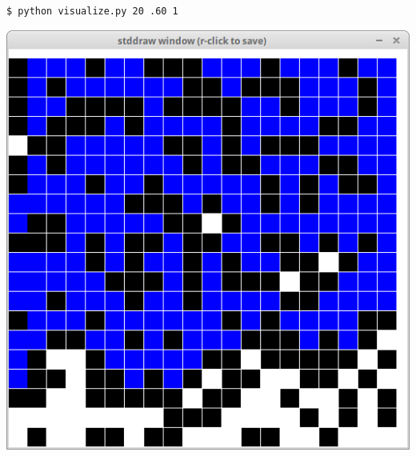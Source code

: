 \documentclass[8pt,a4paper,compress,handout]{beamer}
\begin{document}
\begin{frame}[fragile]
\begin{minipage}{160pt}
\begin{lstlisting}[language={}]
$ python visualize.py 20 .60 1
\end{lstlisting}
\end{minipage}%
\begin{minipage}{140pt}
\hfill \includegraphics[scale=0.15]{figures/percolation11.png}
\end{minipage}

\smallskip


\end{frame}
\end{document}
